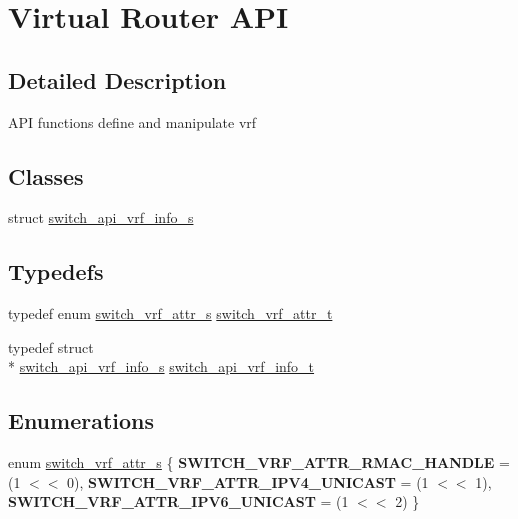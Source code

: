 \hypertarget{group__VRF}{\section{Virtual Router A\+P\+I}
\label{group__VRF}
}


\subsection{Detailed Description}
A\+P\+I functions define and manipulate vrf \subsection*{Classes}
\begin{DoxyCompactItemize}
\item 
struct \hyperlink{structswitch__api__vrf__info__s}{switch\+\_\+api\+\_\+vrf\+\_\+info\+\_\+s}
\end{DoxyCompactItemize}
\subsection*{Typedefs}
\begin{DoxyCompactItemize}
\item 
typedef enum \hyperlink{group__VRF_gaa744243387e6ba5060d6f1fc951b451a}{switch\+\_\+vrf\+\_\+attr\+\_\+s} \hyperlink{group__VRF_gafbc9b07a84dd1748e55ab9ebf00f0be6}{switch\+\_\+vrf\+\_\+attr\+\_\+t}
\item 
typedef struct \\*
\hyperlink{structswitch__api__vrf__info__s}{switch\+\_\+api\+\_\+vrf\+\_\+info\+\_\+s} \hyperlink{group__VRF_ga44195f5d4f2288238ecc29f5a20f9a21}{switch\+\_\+api\+\_\+vrf\+\_\+info\+\_\+t}
\end{DoxyCompactItemize}
\subsection*{Enumerations}
\begin{DoxyCompactItemize}
\item 
enum \hyperlink{group__VRF_gaa744243387e6ba5060d6f1fc951b451a}{switch\+\_\+vrf\+\_\+attr\+\_\+s} \{ {\bfseries S\+W\+I\+T\+C\+H\+\_\+\+V\+R\+F\+\_\+\+A\+T\+T\+R\+\_\+\+R\+M\+A\+C\+\_\+\+H\+A\+N\+D\+L\+E} = (1 $<$$<$ 0), 
{\bfseries S\+W\+I\+T\+C\+H\+\_\+\+V\+R\+F\+\_\+\+A\+T\+T\+R\+\_\+\+I\+P\+V4\+\_\+\+U\+N\+I\+C\+A\+S\+T} = (1 $<$$<$ 1), 
{\bfseries S\+W\+I\+T\+C\+H\+\_\+\+V\+R\+F\+\_\+\+A\+T\+T\+R\+\_\+\+I\+P\+V6\+\_\+\+U\+N\+I\+C\+A\+S\+T} = (1 $<$$<$ 2)
 \}
\end{DoxyCompactItemize}

